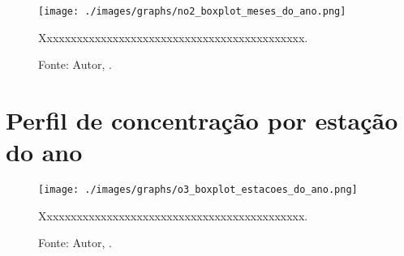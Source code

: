 


\lipsum[100]




\begin{figure}[H]
    \centering
    \texttt{[image: ./images/graphs/no2\_boxplot\_meses\_do\_ano.png]}
    \caption{Xxxxxxxxxxxxxxxxxxxxxxxxxxxxxxxxxxxxxxxxxxxx.}
    \label{fig:no2_boxplot_meses_do_ano.png}
    \caption*{Fonte: Autor, \imprimirdata.}
\end{figure}




\lipsum[100]



\section{Perfil de concentração por estação do ano}



\lipsum[100]




\begin{figure}[H]
    \centering
    \texttt{[image: ./images/graphs/o3\_boxplot\_estacoes\_do\_ano.png]}
    \caption{Xxxxxxxxxxxxxxxxxxxxxxxxxxxxxxxxxxxxxxxxxxxx.}
    \label{fig:o3_boxplot_estacoes_do_ano.png}
    \caption*{Fonte: Autor, \imprimirdata.}
\end{figure}

